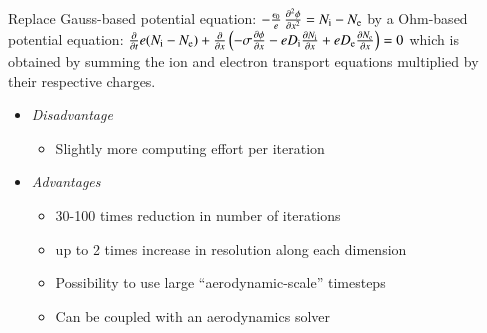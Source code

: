 \documentclass{projector}
\begin{document}
\begin{slide}
\flushleft
\vfill
Replace Gauss-based potential equation:
\vfill
 \begin{math}
-\frac{\epsilon_0}{e} \, \frac{\partial^2\phi}{\partial x^2} =  N_{\rm i} - N_{\rm e}
\end{math}
\vfill
by a Ohm-based potential equation:
\vfill
\begin{math}
\frac{\partial }{\partial t}e(N_{\rm i}-N_{\rm e}) +  \frac{\partial}{\partial x} \left(  -\sigma \frac{\partial \phi}{\partial x}
             -   e D_{\rm i}  \frac{\partial N_{\rm i}}{\partial x}
             +   e D_{\rm e}  \frac{\partial N_{\rm e}}{\partial x}
\right) = 0
\end{math}
\vfill
which is obtained by summing the ion and electron transport equations multiplied by their respective charges.
\vfill
\end{slide}












\begin{slide}
\vfill
\begin{itemize}
\item \emph{Disadvantage}
      \begin{itemize}
        \item Slightly more computing effort per iteration
      \end{itemize}
\vspace{0.8em}
\item \emph{Advantages}
      \begin{itemize}
        \item 30-100 times reduction in number of iterations
        \item up to 2 times increase in resolution along each dimension
        \item Possibility to use large ``aerodynamic-scale'' timesteps 
        \item Can be coupled with an aerodynamics solver 
      \end{itemize}
 \vfill\vfill
\end{itemize}
\end{slide}
\end{document}
